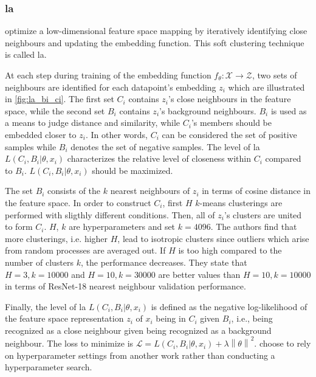 \subsubsection{\acl{la}}\label{subsec:local_aggregation}


\citet{local_aggr_2019} optimize a low-dimensional feature space mapping by 
iteratively identifying close neighbours and updating the embedding function.
This soft clustering technique is called \ac{la}.

At each step during training of the embedding function $f_\theta: \mathcal{X} \rightarrow \mathcal{Z}$, 
two sets of neighbours are identified for each datapoint's embedding $z_i$ 
which are illustrated in \autoref{fig:la_bi_ci}.
The first set $C_i$ contains $z_i$'s close neighbours in the feature space, while
the second set $B_i$ contains $z_i$'s background neighbours.
$B_i$ is used as a means to judge distance and similarity, 
while $C_i$'s members should be embedded closer to $z_i$.
In other words, $C_i$ can be considered the set of positive samples while 
$B_i$ denotes the set of negative samples.
The level of \ac{la} $L(C_i,B_i | \theta, x_i)$ 
characterizes the relative level of closeness within $C_i$ compared to $B_i$.
$L(C_i,B_i | \theta, x_i)$ should be maximized.

The set $B_i$ consists of the $k$ nearest neighbours of $z_i$ in terms of cosine distance 
in the feature space.
In order to construct $C_i$, 
first $H$ $k$-means clusterings are performed with sligthly different conditions.
Then, all of $z_i$'s clusters are united to form $C_i$.
$H$, $k$ are hyperparameters and \citet{local_aggr_2019} set $k=4096$.
The authors find that more clusterings, i.e. higher $H$, lead to isotropic clusters since outliers which arise from random processes are averaged out.
If $H$ is too high compared to the number of clusters $k$, the performance decreases.
They state that $H=3, k=10000$ and $H=10, k=30000$ are better values than $H=10, k=10000$ 
in terms of ResNet-18 nearest neighbour validation performance.

Finally, the level of \ac{la} $L(C_i,B_i | \theta, x_i)$ is defined as the negative log-likelihood 
of the feature space representation $z_i$ of $x_i$ being in $C_i$ given $B_i$, 
i.e., being recognized as a close neighbour given being recognized as a background neighbour.
The loss to minimize is $\mathcal{L} = L(C_i,B_i | \theta, x_i) + \lambda \left\| \theta \right\|^2$.
\citet{local_aggr_2019} choose to rely on hyperparameter settings from another work rather than conducting a hyperparameter search.

